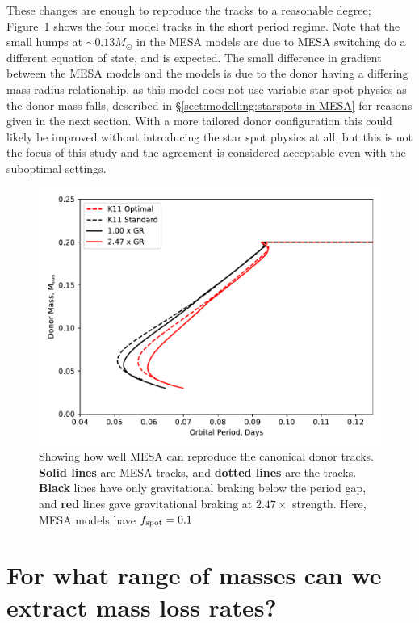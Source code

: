 These changes are enough to reproduce the \citet{knigge11} tracks to a reasonable degree; Figure~\ref{fig:results:MESA can reproduce the K11 tracks} shows the four model tracks in the short period regime.
Note that the small humps at $\sim 0.13 M_\odot$ in the MESA models are due to MESA switching do a different equation of state, and is expected.
The small difference in gradient between the MESA models and the \citet{knigge11} models is due to the donor having a differing mass-radius relationship, as this model does not use variable star spot physics as the donor mass falls, described in \S\ref{sect:modelling:starspots in MESA} for reasons given in the next section.
With a more tailored donor configuration this could likely be improved without introducing the star spot physics at all, but this is not the focus of this study and the agreement is considered acceptable even with the suboptimal settings.

\begin{figure}
    \centering
    \includegraphics[width=.9\textwidth]{figures/modelling/reproducing_K11_tracks_fspot0.100.pdf}
    \caption{Showing how well MESA can reproduce the canonical \citet{knigge11} donor tracks. {\bf Solid lines} are MESA tracks, and {\bf dotted lines} are the \citet{knigge11} tracks. {\bf Black} lines have only gravitational braking below the period gap, and {\bf red} lines gave gravitational braking at $2.47\times$ strength. Here, MESA models have $f_{\rm spot} = 0.1$}
    \label{fig:results:MESA can reproduce the K11 tracks}
\end{figure}



\section{For what range of masses can we extract mass loss rates?}
\label{sect:results:MESA massloss allowable mass range}

